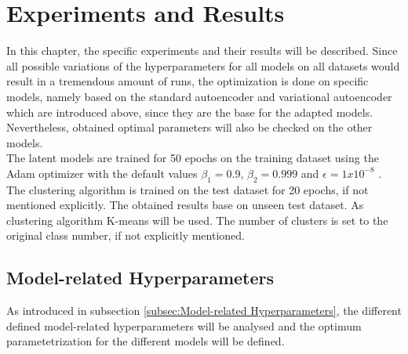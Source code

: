 \documentclass[12pt,DIV14,BCOR12mm,a4paper,footexclude,headinclude,halfparskip-,twoside,openright,cleardoubleempty,idxtotoc,bibtotoc,listtotoc,abstracton]{scrreprt} %
\numberwithin{equation}{chapter}
\begin{document}
\chapter{Experiments and Results}
In this chapter, the specific experiments and their results will be described. Since all possible variations of the hyperparameters for all models on all datasets would result in a tremendous amount of runs, the optimization is done on specific models, namely based on the standard autoencoder and variational autoencoder which are introduced above, since they are the base for the adapted models. Nevertheless, obtained optimal parameters will also be checked on the other models.\\
The latent models are trained for 50 epochs on the training dataset using the Adam optimizer with the default values $\beta_1=0.9$, $\beta_2=0.999$ and $\epsilon = 1x10^{-8}$ \cite{Kingma14AdamOptimizer}. The clustering algorithm is trained on the test dataset for 20 epochs, if not mentioned explicitly. The obtained results base on unseen test dataset. As clustering algorithm K-means will be used. The number of clusters is set to the original class number, if not explicitly mentioned.\\
\section{Model-related Hyperparameters}
As introduced in subsection \ref{subsec:Model-related Hyperparameters}, the different defined model-related hyperparameters will be analysed and the optimum parametetrization for the different models will be defined. 
\end{document}
